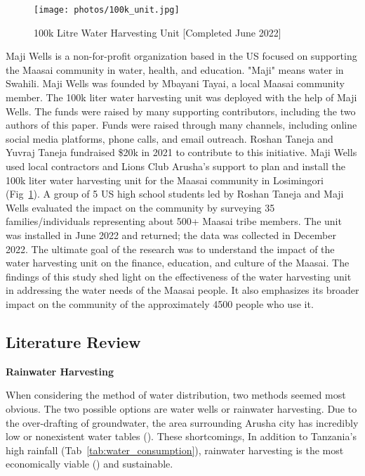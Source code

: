 \documentclass[10pt, twocolumn]{article}
\begin{document}
\begin{figure} [H]
    \centering
    \texttt{[image: photos/100k\_unit.jpg]}
    \caption{100k Litre Water Harvesting Unit [Completed June 2022]}
    \label{fig:100k_unit}
\end{figure}


Maji Wells is a non-for-profit organization based in the US focused on supporting the Maasai community in water, health, and education. "Maji" means water in Swahili. Maji Wells was founded by Mbayani Tayai, a local Maasai community member. The 100k liter water harvesting unit was deployed with the help of Maji Wells. The funds were raised by many supporting contributors, including the two authors of this paper. Funds were raised through many channels, including online social media platforms, phone calls, and email outreach. Roshan Taneja and Yuvraj Taneja fundraised \$20k in 2021 to contribute to this initiative. Maji Wells used local contractors and Lions Club Arusha's support to plan and install the 100k liter water harvesting unit for the Maasai community in Losimingori (Fig~\ref{fig:100k_unit}). A group of 5 US high school students led by Roshan Taneja and Maji Wells evaluated the impact on the community by surveying 35 families/individuals representing about 500+ Maasai tribe members. The unit was installed in June 2022 and returned; the data was collected in December 2022. The ultimate goal of the research was to understand the impact of the water harvesting unit on the finance, education, and culture of the Maasai. The findings of this study shed light on the effectiveness of the water harvesting unit in addressing the water needs of the Maasai people. It also emphasizes its broader impact on the community of the approximately 4500 people who use it.

\subsection{Literature Review}

\textbf{Rainwater Harvesting}

When considering the method of water distribution, two methods seemed most obvious. The two possible options are water wells or rainwater harvesting. Due to the over-drafting of groundwater, the area surrounding Arusha city has incredibly low or nonexistent water tables (\autocite{Ongor2007}). These shortcomings, In addition to Tanzania's high rainfall (Tab~\ref{tab:water_consumption}), rainwater harvesting is the most economically viable (\autocite{TZ_Water_Harvesting}) and sustainable.
\end{document}
